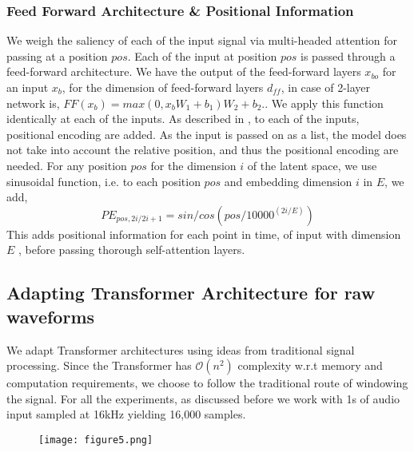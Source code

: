 \documentclass{article}
\begin{document}
\begin{sloppy}
\subsubsection {Feed Forward Architecture \&  Positional Information } We weigh the saliency of each of the input signal via multi-headed attention for passing at a position $pos$. Each of the input at position $pos$ is passed through a feed-forward architecture. We have the output of the feed-forward layers $x_{bo}$ for an input $x_b$, for the dimension of feed-forward layers $d_{ff}$, in case of 2-layer network is, $ FF(x_b) = max(0,x_bW_{1}+ b_{1})W_{2} + b_2. $. We apply this function identically at each of the inputs. As described in \cite{vaswani2017attention}, to each of the inputs, positional encoding are added. As the input is passed on as a list, the model does not take into account the relative position, and thus the positional encoding are needed. For any position $pos$ for the dimension $i$ of the latent space, we use sinusoidal function, i.e. to each position $pos$ and embedding dimension $i$ in $E$, we add, $$ PE_{pos,2i/2i+1} = sin/cos(pos/10000^{(2i/E)})$$ This adds positional information for each point in time, of input with dimension $E$ , before passing thorough self-attention layers. 

\subsection{Adapting Transformer Architecture for raw waveforms}
We adapt Transformer architectures using ideas from traditional signal processing. Since the Transformer has $\mathcal{O}(n^2)$  complexity w.r.t memory and computation requirements, we choose to follow the traditional route of windowing the signal. For all the experiments, as discussed before we work with 1s of audio input sampled at 16kHz yielding 16,000 samples. 

\begin{figure}[h]
\centering
\texttt{[image: figure5.png]}
\end{figure}


\end{sloppy}
\end{document}
